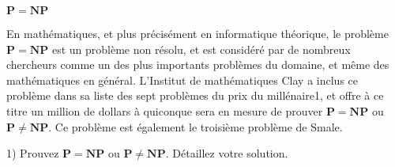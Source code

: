 \documentclass[../../TD/TD_template_CoursIsenLaTeX.tex]{subfiles}
\begin{document}
\begin{Exercice}
\label{ex:CH1:ex1}$\mathbf{P} = \mathbf{NP}$
\end{Exercice}

En mathématiques, et plus précisément en informatique théorique, le problème $\mathbf{P} = \mathbf{NP}$ est un problème non résolu, et est considéré par de nombreux chercheurs comme un des plus importants problèmes du domaine, et même des mathématiques en général. L'Institut de mathématiques Clay a inclus ce problème dans sa liste des sept problèmes du prix du millénaire1, et offre à ce titre un million de dollars à quiconque sera en mesure de prouver $\mathbf{P} = \mathbf{NP}$ ou $\mathbf{P} \not = \mathbf{NP}$. Ce problème est également le troisième problème de Smale.

1) Prouvez $\mathbf{P} = \mathbf{NP}$ ou $\mathbf{P} \not = \mathbf{NP}$. Détaillez votre solution.
\end{document}

